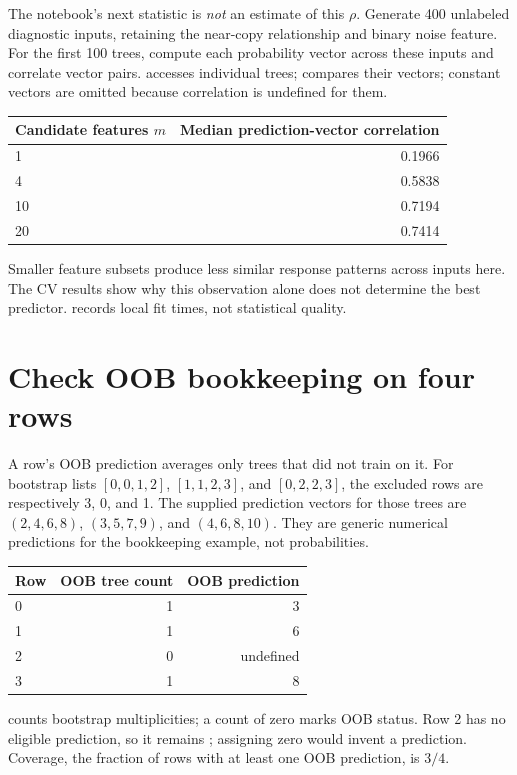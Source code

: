 The notebook's next statistic is \emph{not} an estimate of this $\rho$. Generate 400 unlabeled diagnostic inputs, retaining the near-copy relationship and binary noise feature. For the first 100 trees, compute each probability vector across these inputs and correlate vector pairs.  accesses individual trees;  compares their vectors; constant vectors are omitted because correlation is undefined for them.
\begin{center}
\begin{tabular}{lr}\toprule
Candidate features $m$&Median prediction-vector correlation\\\midrule
1&0.1966\\
4&0.5838\\
10&0.7194\\
20&0.7414\\\bottomrule
\end{tabular}
\end{center}
Smaller feature subsets produce less similar response patterns across inputs here. The CV results show why this observation alone does not determine the best predictor.  records local fit times, not statistical quality.

\section{Check OOB bookkeeping on four rows}
A row's OOB prediction averages only trees that did not train on it. For bootstrap lists $[0,0,1,2]$, $[1,1,2,3]$, and $[0,2,2,3]$, the excluded rows are respectively 3, 0, and 1.
The supplied prediction vectors for those trees are $(2,4,6,8)$, $(3,5,7,9)$, and $(4,6,8,10)$. They are generic numerical predictions for the bookkeeping example, not probabilities.
\begin{center}
\begin{tabular}{lrr}\toprule
Row&OOB tree count&OOB prediction\\\midrule
0&1&3\\
1&1&6\\
2&0&undefined\\
3&1&8\\\bottomrule
\end{tabular}
\end{center}
 counts bootstrap multiplicities; a count of zero marks OOB status. Row 2 has no eligible prediction, so it remains ; assigning zero would invent a prediction. Coverage, the fraction of rows with at least one OOB prediction, is $3/4$.


